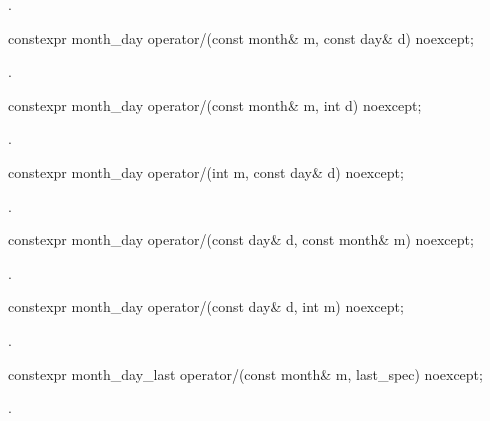 \begin{itemdescr}
\pnum
\returns {}.
\end{itemdescr}

\begin{itemdecl}
constexpr month_day
  operator/(const month& m, const day& d) noexcept;
\end{itemdecl}

\begin{itemdescr}
\pnum
\returns {}.
\end{itemdescr}

\begin{itemdecl}
constexpr month_day
  operator/(const month& m, int d) noexcept;
\end{itemdecl}

\begin{itemdescr}
\pnum
\returns {}.
\end{itemdescr}

\begin{itemdecl}
constexpr month_day
  operator/(int m, const day& d) noexcept;
\end{itemdecl}

\begin{itemdescr}
\pnum
\returns {}.
\end{itemdescr}

\begin{itemdecl}
constexpr month_day
  operator/(const day& d, const month& m) noexcept;
\end{itemdecl}

\begin{itemdescr}
\pnum
\returns {}.
\end{itemdescr}

\begin{itemdecl}
constexpr month_day
  operator/(const day& d, int m) noexcept;
\end{itemdecl}

\begin{itemdescr}
\pnum
\returns {}.
\end{itemdescr}

\begin{itemdecl}
constexpr month_day_last
  operator/(const month& m, last_spec) noexcept;
\end{itemdecl}

\begin{itemdescr}
\pnum
\returns {}.
\end{itemdescr}

